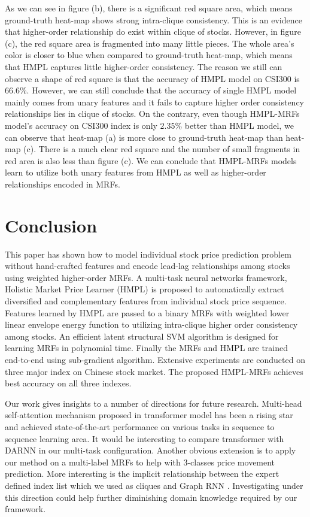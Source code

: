 \documentclass[sigconf, anonymous, review]{acmart}
\renewcommand{\cite}{\citep}
\begin{document}
As we can see in figure (b), there is a significant red square
area, which means ground-truth heat-map shows strong intra-clique
consistency. This is an evidence that higher-order relationship
do exist within clique of stocks. However, in figure (c), the red
square area is fragmented into many little pieces. The whole
area's color is closer to blue when compared to ground-truth
heat-map, which means that HMPL captures little higher-order consistency.
The reason we still can observe a shape of red square
is that the accuracy of HMPL model on CSI300 is $66.6\%$.
However, we can still conclude that the accuracy of single HMPL
model mainly comes from unary features and it fails to capture
higher order consistency relationships lies in clique of stocks.
On the contrary, even though HMPL-MRFs model's accuracy on CSI300
index is only $2.35\%$ better than HMPL model, we can observe
that heat-map (a) is more close to ground-truth heat-map than
heat-map (c). There is a much clear red square and the number of
small fragments in red area is also less than figure (c). We can
conclude that HMPL-MRFs models learn to utilize both unary
features from HMPL as well as higher-order relationships encoded
in MRFs.

\section{Conclusion}
\label{sec:conc}

This paper has shown how to model individual stock price
prediction problem without hand-crafted features and encode
lead-lag relationships among stocks using weighted higher-order
MRFs. A multi-task neural networks framework, Holistic Market
Price Learner (HMPL) is proposed to automatically extract
diversified and complementary features from individual stock
price sequence. Features learned by HMPL are passed to a binary
MRFs with weighted lower linear envelope energy function to
utilizing intra-clique higher order consistency among stocks. An
efficient latent structural SVM algorithm is designed for
learning MRFs in polynomial time. Finally the MRFs and HMPL are
trained end-to-end using sub-gradient algorithm. Extensive
experiments are conducted on three major index on Chinese stock
market. The proposed HMPL-MRFs achieves best accuracy on all
three indexes.

Our work gives insights to a number of directions for future
research. Multi-head self-attention mechanism proposed in
transformer model\cite{vaswani2017attention} has been a rising
star and achieved state-of-the-art performance on various tasks
in sequence to sequence learning area. It would be interesting to
compare transformer with DARNN in our multi-task configuration.
Another obvious extension is to apply our method on a multi-label
MRFs to help with 3-classes price movement prediction. More
interesting is the implicit relationship between the expert
defined index list which we used as cliques and Graph RNN
\cite{you2018graphrnn}. Investigating under this direction could
help further diminishing domain knowledge required by our
framework.





\end{document}
